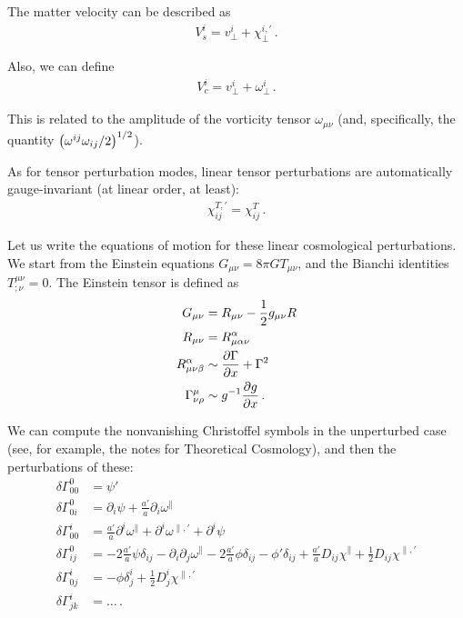\documentclass[main.tex]{subfiles}
\begin{document}
The matter velocity can be described as 
%
\begin{align}
V^{i}_{s} = v^{i}_{\perp} + \chi^{i, \prime}_{\perp}
\,.
\end{align}

Also, we can define 
%
\begin{align}
V^{i}_{c} = v^{i}_{\perp} + \omega^{i}_{\perp}
\,.
\end{align}

This is related to the amplitude of the vorticity tensor \(\omega_{\mu \nu }\) (and, specifically, the quantity \(\qty(\omega^{ij} \omega_{ij} / 2)^{1/2}\)). 

As for tensor perturbation modes, linear tensor perturbations are automatically gauge-invariant (at linear order, at least): 
%
\begin{align}
\chi^{T, \prime}_{ij} =
\chi^{T}_{ij} 
\,.
\end{align}

Let us write the equations of motion for these linear cosmological perturbations. 
We start from the Einstein equations \(G_{\mu \nu } = 8 \pi G T_{\mu \nu }\), and the Bianchi identities \(T^{\mu \nu }_{; \nu } = 0\). 
The Einstein tensor is defined as 
%
\begin{align}
G_{\mu \nu } &= R_{\mu \nu } - \frac{1}{2} g_{\mu \nu } R  \\
R_{\mu \nu } &= R^{\alpha }_{\mu \alpha \nu }  \\
R^{\alpha }_{\mu \nu \beta }&\sim \pdv{\Gamma }{x} + \Gamma^2  \\
\Gamma^{\mu }_{\nu \rho } &\sim g^{-1} \pdv{g}{x}
\,.
\end{align}

We can compute the nonvanishing Christoffel symbols in the unperturbed case (see, for example, the notes for Theoretical Cosmology), and then the perturbations of these: 
%
\begin{align}
\delta \Gamma^{0}_{00} &= \psi '  \\
\delta \Gamma^{0}_{0i} &= \partial_{i} \psi + \frac{a'}{a} \partial_{i} \omega^{\parallel}  \\
\delta \Gamma^{i}_{00} &= \frac{a'}{a} \partial^{i} \omega^{\parallel} + \partial^{i} \omega^{\parallel, \prime} + \partial^{i} \psi  \\
\delta \Gamma^{0}_{ij} &= -2 \frac{a'}{a} \psi \delta_{ij} - \partial_{i} \partial_{j} \omega^{\parallel} - 2 \frac{a'}{a} \phi \delta_{ij} 
- \phi ' \delta_{ij} + \frac{a'}{a} D_{ij} \chi^{\parallel} + \frac{1}{2} D_{ij} \chi^{\parallel, \prime}  \\
\delta \Gamma^{i}_{0j} &= - \phi \delta^{i}_{j} + \frac{1}{2} D^{i}_{j} \chi^{\parallel, \prime}  \\
\delta \Gamma^{i}_{jk} &= \dots
\,.
\end{align}
\end{document}
